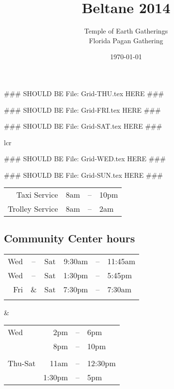 \documentclass[letterpaper,10pt,twoside,openright,final,article,landscape]{memoir}
\date{\today}
\title{Beltane 2014}
\author{Temple of Earth Gatherings \\ Florida Pagan Gathering}
\begin{document}
 ### SHOULD BE File: Grid-THU.tex HERE ### 



\vfill 

 ### SHOULD BE File: Grid-FRI.tex HERE ### 



\newpage


 ### SHOULD BE File: Grid-SAT.tex HERE ### 



\small

\begin{tabular}{lcr}

\begin{minipage}{7in}

\small

 ### SHOULD BE File: Grid-WED.tex HERE ### 



 ### SHOULD BE File: Grid-SUN.tex HERE ### 



\begin{center}
  \begin{tabular}{rrcl}
    \hline \large
    Taxi Service & \indent 8am & -- & 10pm \\
    Trolley Service & \indent 8am & -- & 2am \\
    \hline
  \end{tabular}
\end{center}


\subsection{Community Center hours}

\begin{center}
  \begin{tabular}{rclrcl}
    \\ \hline
    Wed & -- & Sat & 9:30am & -- & 11:45am \\
    Wed & -- & Sat & 1:30pm & -- & 5:45pm \\
    Fri & \& & Sat & 7:30pm & -- & 7:30am \\
    \hline \\
  \end{tabular}
\end{center}
\end{minipage} & \begin{minipage}{3in}

\begin{center}
  \begin{tabular}{lrcl}
    \hline
    Wed & 2pm & -- & 6pm \\
    & 8pm & -- & 10pm \\
    \\
    Thu-Sat  & 11am & -- & 12:30pm \\
    & 1:30pm & -- & 5pm \\
    \hline
  \end{tabular}
\end{center}


\end{minipage}
\end{tabular}
\end{document}
